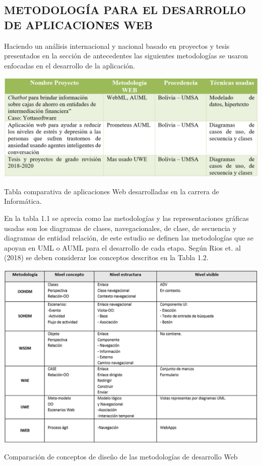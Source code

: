 \documentclass[letter, openright, 12pt]{book}
\newcommand*\setcaptioncitation[1]{\def\captioncitation{\textit{Fuente:}~#1}}
\let\captioncitation\relax
\begin{document}
\subsection{METODOLOGÍA PARA EL DESARROLLO DE APLICACIONES WEB}
Haciendo un análisis internacional y nacional basado en proyectos y tesis presentados en la sección de antecedentes las siguientes metodologías se usaron enfocadas en el desarrollo de la aplicación. 

\begin{table}[!ht]
\includegraphics[width=1\textwidth]{tabla1_1}
\caption{Tabla comparativa de aplicaciones Web desarrolladas en la carrera de Informática.} 
\label{tab:tabla1_1} 
\end{table}

En la tabla 1.1 se aprecia como las metodologías y las representaciones gráficas usadas son los diagramas de clases, navegacionales, de clase, de secuencia y diagramas de entidad relación, de este estudio se definen las metodologías que se apoyan en UML o AUML para el desarrollo de cada etapa. Según Rios et. al (2018) se deben considerar los conceptos descritos en la Tabla 1.2.

\begin{table}[!ht]
\includegraphics[width=1\textwidth]{tabla1_2}
\setcaptioncitation{(Rios et al., 2018)}
\caption{Comparación de conceptos de diseño de las metodologías de desarrollo Web}
\label{tab:tabla1_2} 
\end{table}
\end{document}
